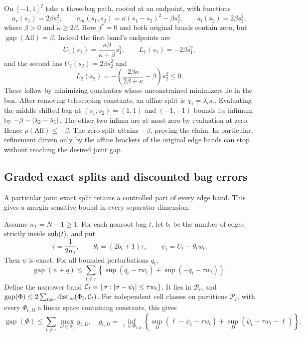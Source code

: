 \begin{example}
\label{ex:consistency-obstruction}
On $[-1,1]^2$ take a three-bag path, rooted at an endpoint, with functions
\[
 a_r(s_1)=2\beta s_1^2,\qquad
 a_m(s_1,s_2)=\kappa(s_1-s_2)^2-\beta s_2^2,\qquad
 a_l(s_2)=2\beta s_2^2,
\]
where $\beta>0$ and $\kappa\ge2\beta$.
Here $f^*=0$ and both original bands contain zero, but
$\operatorname{gap}(\mathrm{Aff})=\beta$.
Indeed the first band's endpoints are
\[
 U_1(s_1)=\frac{\kappa\beta}{\kappa+\beta}s_1^2,
 \qquad L_1(s_1)=-2\beta s_1^2,
\]
and the second has $U_2(s_2)=2\beta s_2^2$ and
\[
 L_2(s_2)=-\left(\frac{2\beta\kappa}{2\beta+\kappa}-\beta\right)s_2^2\le0.
\]
These follow by minimizing quadratics whose unconstrained minimizers lie
in the box.  After removing telescoping constants, an affine split is
$\chi_i=\lambda_i s_i$.  Evaluating the middle shifted bag at
$(s_1,s_2)=(1,1)$ and $(-1,-1)$ bounds its infimum by
$-\beta-\left\lvert \lambda_2-\lambda_1\right\rvert$.  The other two infima are at most zero
by evaluation at zero.  Hence $\rho(\mathrm{Aff})\le-\beta$.
The zero split attains $-\beta$, proving the claim.
In particular, refinement driven only by the affine brackets of the
original edge bands can stop without reaching the desired joint gap.
\end{example}

\subsection{Graded exact splits and discounted bag errors}

A particular joint exact split retains a controlled part of every edge
band.  This gives a margin-sensitive bound in every separator dimension.

\begin{theorem}
\label{thm:consistency-graded}
Assume $n_T=N-1\ge1$.  For each nonroot bag $t$, let $b_t$ be the number of
edges strictly inside $\operatorname{sub}(t)$, and put
\begin{equation}
\label{eq:consistency-graded}
 \tau=\frac1{2n_T},\qquad
 \theta_t=(2b_t+1)\tau,\qquad \psi_t=U_t-\theta_tw_t.
\end{equation}
Then $\psi$ is exact.  For all bounded perturbations $q_t$,
\begin{equation}
\label{eq:consistency-discount}
 \operatorname{gap}(\psi+q)
 \le\sum_{t\ne r}\left\{\sup(q_t-\tau w_t)+\sup(-q_t-\tau w_t)\right\}.
\end{equation}
Define the narrower band
$\mathcal C_t=\{\sigma:\left\lvert \sigma-\psi_t\right\rvert\le\tau w_t\}$.
It lies in $\mathcal B_t$, and
$\operatorname{gap}(\Phi)\le2\sum_{t\ne r}\operatorname{dist}_\infty(\Phi_t,\mathcal C_t)$.
For independent cell classes on partitions $\mathcal P_t$, with every
$\Phi_{t,D}$ a linear space containing constants, this gives
\begin{equation}
\label{eq:consistency-cell-sandwich}
 \operatorname{gap}(\Phi)\le\sum_{t\ne r}\max_{D\in\mathcal P_t}g_{t,D},
 \quad
 g_{t,D}=\inf_{\ell\in\Phi_{t,D}}
 \left\{\sup_D(\ell-\psi_t-\tau w_t)
              +\sup_D(\psi_t-\tau w_t-\ell)\right\}.
\end{equation}
\end{theorem}


